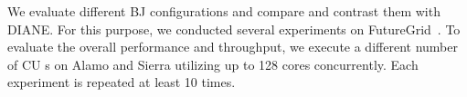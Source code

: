 \documentclass[conference,final]{IEEEtran}
\makeatletter
\def\reduwave{\bgroup \markoverwith{\lower3.5\p@\hbox{\sixly \textcolor{red}{\char58}}}\ULon}
\newcommand{\jwave}[1]{ {\reduwave{#1}}}
\newcommand{\jhanote}[1]{ {\textcolor{red} { ***shantenu: #1 }}}
\newcommand{\alnote}[1]{ {\textcolor{blue} { ***andre: #1 }}}
\newcommand{\jwave}[1]{#1}
\newcommand{\alnote}[1]{}
\newcommand{\jhanote}[1]{}
\newcommand{\cu}{CU\xspace}
\makeatother
\begin{document}
We evaluate different BJ configurations and compare and contrast them
with DIANE. For this purpose, we conducted several experiments on
FutureGrid~\cite{fg}. To evaluate the overall performance and
throughput, we execute a different number of \cu s on Alamo and Sierra
utilizing up to 128 cores concurrently. Each experiment is repeated at
least 10 times.






\end{document}
